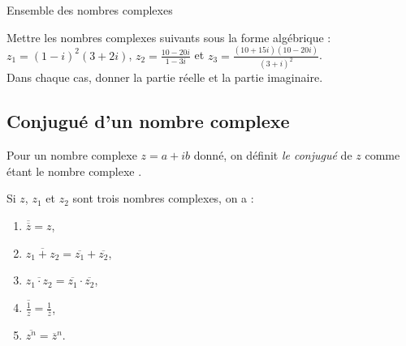 \begin{chapter}{Ensemble des nombres complexes}
\begin{exe}
Mettre les nombres complexes suivants sous la forme alg\'ebrique : \\
$z_1 = (1-i)^2 (3 + 2i)$, $z_2 = \frac{10-20i}{1-3i}$ et $z_3 = \frac{(10+15i)(10-20i)}{(3+i)^2} $. \\
Dans chaque cas, donner la partie r\'eelle et la partie imaginaire.
\label{exe:mettre sous forme algebrique}
\end{exe}

\subsection{Conjugu\'e d'un nombre complexe}
%
\begin{defi}
Pour un nombre complexe $z = a + i b$ donn\'e, on d\'efinit \emph{le conjugu\'e} de $z$ comme \'etant le nombre complexe
.
\end{defi}
%
\begin{prop}
      \label{prp:proprietes du conjugue}
	Si $z$, $z_1$ et $z_2$ sont trois nombres complexes, on a : 
	\renewcommand{\bar}{\overline}
	\begin{enumerate}
		\item $\bar{\bar{z}} = z$,
		\item $\bar{z_1 + z_2} = \bar{z_1} + \bar{z_2}$,
		\item $\bar{z_1 \cdot z_2} = \bar{z_1} \cdot \bar{z_2}$,
		      \label{prp:proprietes du conjugue, multiplication}
		\item $\bar{\frac{1}{z}} = \frac{1}{\bar{z}}$,
		\item $\bar{z^n} = \bar{z}^n$.
	\end{enumerate}
\end{prop}
%
%

\end{chapter}
